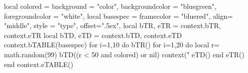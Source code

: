 

\definecolor[bluegreen][h=4F6F6F]
\definecolor[bluered][h=6F4F6F]
\startTEXpage
\startluacode
  local colored = {
    background = "color",
    backgroundcolor = "bluegreen",
    foregroundcolor = "white",
  }
  local basespec = {
    framecolor = "bluered",
    align= "middle",
    style = "type",
    offset=".5ex",
  }
  local bTR, eTR = context.bTR, context.eTR
  local bTD, eTD = context.bTD, context.eTD
  context.bTABLE(basespec)
    for i=1,10 do
      bTR()
      for i=1,20 do
        local r= math.random(99)
        bTD((r < 50 and colored) or nil)
        context("%
        eTD()
      end
      eTR()
    end
  context.eTABLE()
\stopluacode
\stopTEXpage